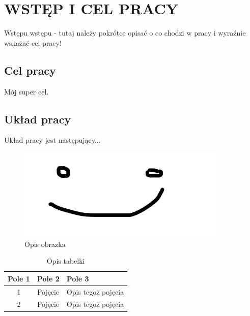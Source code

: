 \chapter{WSTĘP I CEL PRACY}
\label{chap:introduction}
Wstępu wstępu - tutaj należy pokrótce opisać o co chodzi w pracy i wyraźnie wskazać cel pracy!
\section{Cel pracy}
Mój super cel. 
\section{Układ pracy}
Układ pracy jest następujący...

\begin{figure}[htbp]
    \centering
    \includegraphics[width=0.9\textwidth]{images/obrazek.png}
    \caption{Opis obrazka}
    \label{fig:buzka}
\end{figure}


\begin{table}[h]
\caption{Opis tabelki}
\label{tab:tab1}
 \centering
\begin{tabular}{|c|p{4.5cm}|p{6cm}|}
  \hline
  Pole 1 & Pole 2 & Pole 3\\
  \hline
  1 & Pojęcie & Opis tegoż pojęcia\\
  \hline
  2 & Pojęcie & Opis tegoż pojęcia\\
  \hline
\end{tabular}
\end{table}